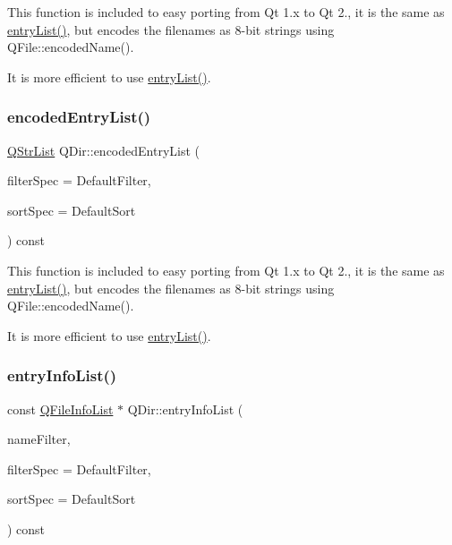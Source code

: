 This function is included to easy porting from Qt 1.\+x to Qt 2., it is the same as \mbox{\hyperlink{class_q_dir_ab5e2b4ce772dc4b8941425cf780df9ab}{entry\+List()}}, but encodes the filenames as 8-\/bit strings using Q\+File\+::encoded\+Name().

It is more efficient to use \mbox{\hyperlink{class_q_dir_ab5e2b4ce772dc4b8941425cf780df9ab}{entry\+List()}}. \mbox{\label{class_q_dir_a584e15a955a13bcabc9ec4b0330b7d5d}} 
\subsubsection{\texorpdfstring{encodedEntryList()}{encodedEntryList()}\hspace{0.1cm}{\footnotesize\ttfamily [2/2]}}
{\footnotesize\ttfamily \mbox{\hyperlink{class_q_str_list}{Q\+Str\+List}} Q\+Dir\+::encoded\+Entry\+List (\begin{DoxyParamCaption}\item[{int}]{filter\+Spec = {\ttfamily DefaultFilter},  }\item[{int}]{sort\+Spec = {\ttfamily DefaultSort} }\end{DoxyParamCaption}) const\hspace{0.3cm}{\ttfamily [virtual]}}

This function is included to easy porting from Qt 1.\+x to Qt 2., it is the same as \mbox{\hyperlink{class_q_dir_ab5e2b4ce772dc4b8941425cf780df9ab}{entry\+List()}}, but encodes the filenames as 8-\/bit strings using Q\+File\+::encoded\+Name().

It is more efficient to use \mbox{\hyperlink{class_q_dir_ab5e2b4ce772dc4b8941425cf780df9ab}{entry\+List()}}. \mbox{\label{class_q_dir_ab0a6216638ea6a4d2564a21a451d215e}} 
\subsubsection{\texorpdfstring{entryInfoList()}{entryInfoList()}\hspace{0.1cm}{\footnotesize\ttfamily [1/2]}}
{\footnotesize\ttfamily const \mbox{\hyperlink{class_q_internal_list}{Q\+File\+Info\+List}} $\ast$ Q\+Dir\+::entry\+Info\+List (\begin{DoxyParamCaption}\item[{const \mbox{\hyperlink{class_q_string}{Q\+String}} \&}]{name\+Filter,  }\item[{int}]{filter\+Spec = {\ttfamily DefaultFilter},  }\item[{int}]{sort\+Spec = {\ttfamily DefaultSort} }\end{DoxyParamCaption}) const\hspace{0.3cm}{\ttfamily [virtual]}}

